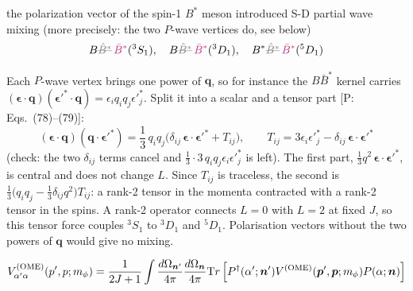 \documentclass[11pt,a4paper]{article}
\newcommand{\tagP}[1]{\textcolor{blue!65!black}{\textsf{\small[P:\,#1]}}}
\newcommand{\ai}[1]{\textcolor{aicolor}{#1}}
\newcommand{\aifixm}[2]{\textcolor{gray}{\text{\sout{$#1$}}}\,\textcolor{aicolor}{#2}}
\newcommand{\ai}[1]{#1}
\newcommand{\aifixm}[2]{#2}
\newenvironment{aiadd}{\par}{\par}
\begin{document}
the polarization vector of the spin-1 $B^*$ meson introduced S-D partial wave mixing \ai{(more precisely: the two $P$-wave vertices do, see below)}
\[
	B\aifixm{\hat B^*}{\bar B^*} (^3S_1),\quad B\aifixm{\hat B^*}{\bar B^*}(^3D_1),\quad B^*\aifixm{\hat B^*}{\bar B^*}(^5D_1)
\]
\begin{aiadd}
	Each $P$-wave vertex brings one power of $\bm q$, so for instance the $B\bar B^*$ kernel carries $(\bm\epsilon\cdot\bm q)(\bm\epsilon'^*\cdot\bm q)=\epsilon_iq_iq_j\epsilon'^*_j$. Split it into a scalar and a tensor part \tagP{Eqs.~(78)--(79)}:
	\[
		(\bm\epsilon\cdot\bm q)(\bm q\cdot\bm\epsilon'^*)=\frac13\,q_iq_j\big(\delta_{ij}\,\bm\epsilon\cdot\bm\epsilon'^*+T_{ij}\big),\qquad
		T_{ij}=3\epsilon_i\epsilon'^*_j-\delta_{ij}\,\bm\epsilon\cdot\bm\epsilon'^*
	\]
	(check: the two $\delta_{ij}$ terms cancel and $\frac13\cdot3\,q_iq_j\epsilon_i\epsilon'^*_j$ is left). The first part, $\frac13q^2\,\bm\epsilon\cdot\bm\epsilon'^*$, is central and does not change $L$. Since $T_{ij}$ is traceless, the second is $\frac13\big(q_iq_j-\frac13\delta_{ij}q^2\big)T_{ij}$: a rank-2 tensor in the momenta contracted with a rank-2 tensor in the spins. A rank-2 operator connects $L=0$ with $L=2$ at fixed $J$, so this tensor force couples $^3S_1$ to $^3D_1$ and $^5D_1$. Polarisation vectors without the two powers of $\bm q$ would give no mixing.
\end{aiadd}
\[
	V_{\alpha'\alpha}^{(\rm OME)}(p',p;m_\phi) = \frac{1}{2J+1}\int\frac{d\Omega_{\bm n'}}{4\pi}\frac{d\Omega_{\bm n}}{4\pi}{\mathrm Tr}\left[P^\dagger (\alpha';\bm{n}')V^{(\rm OME)}(\bm{p}',\bm{p};m_\phi)P(\alpha;\bm{n})\right]
\]
\end{document}
